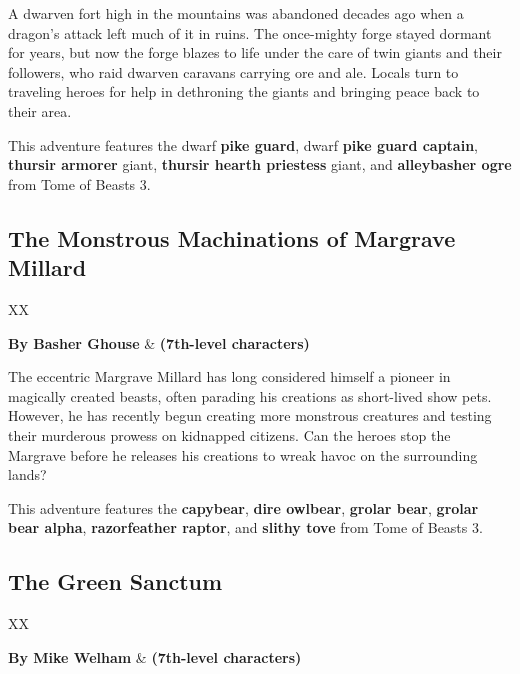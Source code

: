 \documentclass[10pt,a4paper,twoside,bg=print,twocolumn,openany,nodeprecatedcode]{dndbook}
\begin{document}
\begin{DndTable}{XX}

\textbf{By Jonathan Miley} & \textbf{(6th-level says 5th-level.} characters)}\\
\end{DndTable}

A dwarven fort high in the mountains was abandoned decades ago when a dragon's attack left much of it in ruins. The once-mighty forge stayed dormant for years, but now the forge blazes to life under the care of twin giants and their followers, who raid dwarven caravans carrying ore and ale. Locals turn to traveling heroes for help in dethroning the giants and bringing peace back to their area.

This adventure features the dwarf \textbf{pike guard}, dwarf \textbf{pike guard captain}, \textbf{thursir armorer} giant, \textbf{thursir hearth priestess} giant, and \textbf{alleybasher ogre} from Tome of Beasts 3.

\subsection{The Monstrous Machinations of Margrave Millard}

\begin{DndTable}{XX}

\textbf{By Basher Ghouse} & \textbf{(7th-level characters)}\\
\end{DndTable}

The eccentric Margrave Millard has long considered himself a pioneer in magically created beasts, often parading his creations as short-lived show pets. However, he has recently begun creating more monstrous creatures and testing their murderous prowess on kidnapped citizens. Can the heroes stop the Margrave before he releases his creations to wreak havoc on the surrounding lands?

This adventure features the \textbf{capybear}, \textbf{dire owlbear}, \textbf{grolar bear}, \textbf{grolar bear alpha}, \textbf{razorfeather raptor}, and \textbf{slithy tove} from Tome of Beasts 3.

\subsection{The Green Sanctum}

\begin{DndTable}{XX}

\textbf{By Mike Welham} & \textbf{(7th-level characters)}\\
\end{DndTable}
\end{document}

